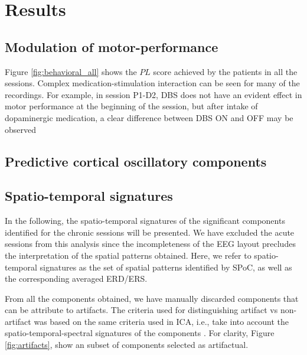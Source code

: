 \documentclass[10pt,a4paper]{article}
\begin{document}
\section{Results}
\def \allsessions {VPpcac_d2,VPpcac_d4,NEW,VPpcad_d2,VPpcad_d4,VPpcae_d4,NEW,VPpcaf_d2,
	VPpcaf_d3,VPpcaf_d4,NEW,VPpcag_d2,VPpcag_d3,VPpcag_d4,NEW,VPpcah_d2,NEW,
	VPpcaj_d2,VPpcaj_d3}

\subsection{Modulation of motor-performance}
Figure \ref{fig:behavioral_all} shows the $PL$ score achieved by the patients in all the sessions. Complex medication-stimulation interaction can be seen for many of the recordings. For example, in session P1-D2, DBS does not have an evident effect in motor performance at the beginning of the session, but after intake of dopaminergic medication, a clear difference between DBS ON and OFF may be observed





\subsection{Predictive cortical oscillatory components}
%


\subsection{Spatio-temporal signatures}
In the following, the spatio-temporal signatures of the significant components identified for the chronic sessions will be presented. We have excluded the acute sessions from this analysis since the incompleteness of the EEG layout precludes the interpretation of the spatial patterns obtained. Here, we refer to spatio-temporal signatures as the set of spatial patterns identified by SPoC, as well as the corresponding averaged ERD/ERS.

From all the components obtained, we have manually discarded components that can be attribute to artifacts. The criteria used for distinguishing artifact vs non-artifact was based on the same criteria used in ICA, i.e., take into account the spatio-temporal-spectral signatures of the components \cite{MARAOrSimilarHowToIdentifyArtifacts}. For clarity, Figure \ref{fig:artifacts}, show an subset of components selected as artifactual.
\end{document}
